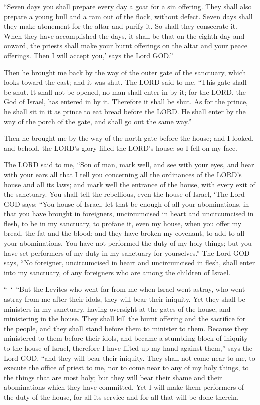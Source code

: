 \myverse{}“Seven days you shall prepare every day a goat for a sin offering.
They shall also prepare a young bull and a ram out of the flock, without defect.
\myverse{}Seven days shall they make atonement for the altar and purify it. So shall
they consecrate it.
\myverse{}When they have accomplished the days, it shall be that on the eighth day
and onward, the priests shall make your burnt offerings on the altar and your peace offerings. Then I
will accept you,’ says the Lord GOD.”


\mychapter{} \myverse*{}Then he brought me back by the way of the outer gate of the sanctuary,
which looks toward the east; and it was shut.
\myverse{}The LORD said to me, “This gate shall be shut. It shall not be opened, no man
shall enter in by it; for the LORD, the God of Israel, has entered in by it. Therefore it shall be shut.
\myverse{}As for the prince, he shall sit in it as prince to eat bread before the LORD.
He shall enter by the way of the porch of the gate, and shall go out the same way.”

\myverse{}Then he brought me by the way of the north gate before the house;
and I looked, and behold, the LORD’s glory filled the LORD’s house; so I fell on my face.

\myverse{}The LORD said to me, “Son of man, mark well, and see with your
eyes, and hear with your ears all that I tell you concerning all the ordinances of the LORD’s house and
all its laws; and mark well the entrance of the house, with every exit of the sanctuary.
\myverse{}You shall tell the rebellious, even the house of Israel, ‘The Lord GOD says:
“You house of Israel, let that be enough of all your abominations,
\myverse{}in that you have brought in foreigners, uncircumcised in heart and uncircumcised
in flesh, to be in my sanctuary, to profane it, even my house, when you offer my bread, the fat and the
blood; and they have broken my covenant, to add to all your abominations.
\myverse{}You have not performed the duty of my holy things; but you have set performers
of my duty in my sanctuary for yourselves.”
\myverse{}The Lord GOD says, “No foreigner, uncircumcised in heart and uncircumcised
in flesh, shall enter into my sanctuary, of any foreigners who are among the children of Israel.

\myverse{}“ ‘ “But the Levites who went far from me when Israel went astray,
who went astray from me after their idols, they will bear their iniquity.
\myverse{}Yet they shall be ministers in my sanctuary, having oversight at the gates
of the house, and ministering in the house. They shall kill the burnt offering and the sacrifice for the
people, and they shall stand before them to minister to them.
\myverse{}Because they ministered to them before their idols, and became a stumbling
block of iniquity to the house of Israel, therefore I have lifted up my hand against them,” says the Lord
GOD, “and they will bear their iniquity.
\myverse{}They shall not come near to me, to execute the office of priest to me, nor
to come near to any of my holy things, to the things that are most holy; but they will bear their shame
and their abominations which they have committed.
\myverse{}Yet I will make them performers of the duty of the house, for all its service
and for all that will be done therein.

